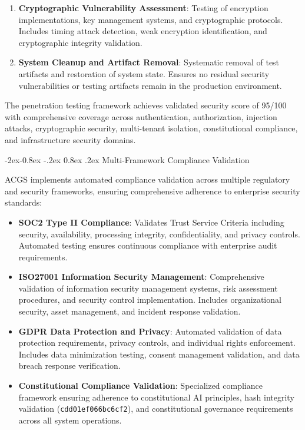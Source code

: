 \documentclass[manuscript,screen,9pt]{acmart}
\makeatletter
\renewcommand\subsubsection{\@startsection{subsubsection}{3}{\z@}%
  {-2ex\@plus -0.8ex \@minus -.2ex}%
  {0.8ex \@plus .2ex}%
  {\normalfont\normalsize\bfseries}}
\makeatother
\begin{document}
\begin{enumerate}[leftmargin=*,itemsep=2pt,parsep=1pt]
    \item \textbf{Cryptographic Vulnerability Assessment}: Testing of encryption implementations, key management systems, and cryptographic protocols. Includes timing attack detection, weak encryption identification, and cryptographic integrity validation.

    \item \textbf{System Cleanup and Artifact Removal}: Systematic removal of test artifacts and restoration of system state. Ensures no residual security vulnerabilities or testing artifacts remain in the production environment.
\end{enumerate}

The penetration testing framework achieves validated security score of 95/100 with comprehensive coverage across authentication, authorization, injection attacks, cryptographic security, multi-tenant isolation, constitutional compliance, and infrastructure security domains.

\subsubsection{Multi-Framework Compliance Validation}
\label{subsubsec:compliance_validation}

ACGS implements automated compliance validation across multiple regulatory and security frameworks, ensuring comprehensive adherence to enterprise security standards:

\begin{itemize}[leftmargin=*,itemsep=2pt,parsep=1pt]
    \item \textbf{SOC2 Type II Compliance}: Validates Trust Service Criteria including security, availability, processing integrity, confidentiality, and privacy controls. Automated testing ensures continuous compliance with enterprise audit requirements.

    \item \textbf{ISO27001 Information Security Management}: Comprehensive validation of information security management systems, risk assessment procedures, and security control implementation. Includes organizational security, asset management, and incident response validation.

    \item \textbf{GDPR Data Protection and Privacy}: Automated validation of data protection requirements, privacy controls, and individual rights enforcement. Includes data minimization testing, consent management validation, and data breach response verification.

    \item \textbf{Constitutional Compliance Validation}: Specialized compliance framework ensuring adherence to constitutional AI principles, hash integrity validation (\texttt{cdd01ef066bc6cf2}), and constitutional governance requirements across all system operations.
\end{itemize}
\end{document}
